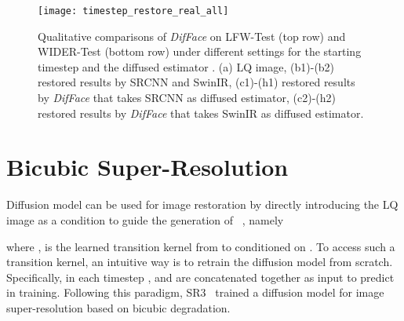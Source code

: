 \documentclass[10pt,twocolumn,letterpaper]{article}
\begin{document}
\begin{figure*}[t]
    \centering
    \texttt{[image: timestep\_restore\_real\_all]}
    \caption{Qualitative comparisons of \textit{DifFace} on LFW-Test (top row) and
        WIDER-Test (bottom row) under different settings for the starting timestep  and the
        diffused estimator . (a) LQ image, (b1)-(b2) restored results
        by SRCNN and SwinIR, (c1)-(h1) restored results by \textit{DifFace} that
        takes SRCNN as diffused estimator, (c2)-(h2) restored results by \textit{DifFace}
        that takes SwinIR as diffused estimator.}
    \label{fig:time_restore_supp_real}
\end{figure*}

\section{Bicubic Super-Resolution}
Diffusion model can be used for image restoration by directly introducing the LQ image  as a condition to guide the generation of ~\cite{saharia2022palette,saharia2022image,song2020score}, namely

where ,  is the learned transition kernel from  to  conditioned on . To access such a transition kernel, an intuitive way is to retrain the diffusion model from scratch. Specifically, in each timestep ,  and  are concatenated together as input to predict  in training. Following this paradigm, SR3~\cite{saharia2022image} trained a diffusion model for image super-resolution based on bicubic degradation.
\end{document}
